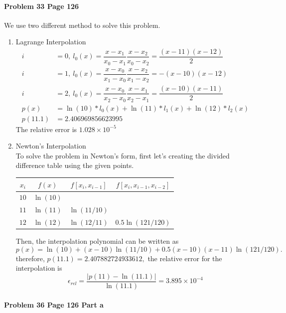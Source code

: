 \documentclass[paper=a4, fontsize=11pt]{scrartcl} %
\numberwithin{equation}{section} %
\numberwithin{figure}{section} %
\numberwithin{table}{section} %
\begin{document}
\paragraph{\textbf{Problem 33 Page 126}}
We use two different method to solve this problem.
\begin{enumerate}
	\item Lagrange Interpolation\\
		\begin{align*}
			i&=0,~l_0(x)=\dfrac{x-x_1}{x_0-x_1}\dfrac{x-x_2}{x_0-x_2}=\dfrac{(x-11)(x-12)}{2}\\
			i&=1,~l_0(x)=\dfrac{x-x_0}{x_1-x_0}\dfrac{x-x_2}{x_1-x_2}=-(x-10)(x-12)\\
			i&=2,~l_0(x)=\dfrac{x-x_0}{x_2-x_0}\dfrac{x-x_1}{x_2-x_1}=\dfrac{(x-10)(x-11)}{2}\\
			p(x)&=\ln(10)*l_0(x)	+ \ln(11)*l_1(x)+\ln(12)*l_2(x)\\
            p(11.1) &= 2.406969856623995
		\end{align*}
		The relative error is $ 1.028\times 10^{-5} $
	
	\item Newton's Interpolation\\
	To solve the problem in Newton's form, first let's creating the divided difference table using the given points.

    \begin{tabular}{ c|c c c }
      $x_i$ & $f(x)$ & $f[x_i,x_{i-1}]$ & $f[x_i,x_{i-1},x_{i-2}]$ \\ \hline
      $10$ & $\ln(10)$ &   &   \\
      $11$ & $\ln(11)$ & $\ln(11/10)$ &   \\
      $12$ & $\ln(12)$ & $\ln(12/11)$ & $0.5\ln(121/120)$ \\
    \end{tabular}

    Then, the interpolation polynomial can be written as $$p(x) = \ln(10) + (x-10)\ln(11/10) + 0.5(x-10)(x-11)\ln(121/120).$$
    therefore, $ p(11.1) = 2.407882724933612,$ the relative error for the interpolation is $$\epsilon_{rel} = \dfrac{|p(11) - \ln(11.1)|}{\ln(11.1)} = 3.895\times 10^{-4}$$

\end{enumerate}
\newpage

\paragraph{\textbf{Problem 36 Page 126 Part a}}
\end{document}
